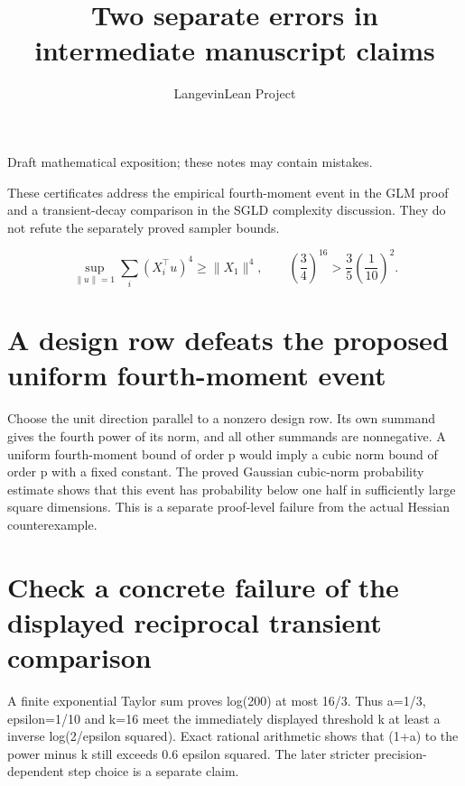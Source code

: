 \documentclass[11pt,a4paper]{article}
\title{\texorpdfstring{Two separate errors in intermediate manuscript claims}{Two separate errors in intermediate manuscript claims}}
\author{LangevinLean Project}
\date{}
\begin{document}
\maketitle
Draft mathematical exposition; these notes may contain mistakes.


These certificates address the empirical fourth-moment event in the GLM proof and a transient-decay comparison in the SGLD complexity discussion. They do not refute the separately proved sampler bounds.

\[\sup_{\|u\|=1}\sum_i(X_i^\top u)^4\ge\|X_1\|^4,\qquad \left(\frac34\right)^{16}>\frac35\left(\frac1{10}\right)^2.\]
\section{\texorpdfstring{A design row defeats the proposed uniform fourth-\allowbreak{}moment event}{A design row defeats the proposed uniform fourth-moment event}}


Choose the unit direction parallel to a nonzero design row. Its own summand gives the fourth power of its norm, and all other summands are nonnegative. A uniform fourth-moment bound of order p would imply a cubic norm bound of order p with a fixed constant. The proved Gaussian cubic-norm probability estimate shows that this event has probability below one half in sufficiently large square dimensions. This is a separate proof-level failure from the actual Hessian counterexample.


\section{\texorpdfstring{Check a concrete failure of the displayed reciprocal transient comparison}{Check a concrete failure of the displayed reciprocal transient comparison}}


A finite exponential Taylor sum proves log(200) at most 16/\allowbreak{}3. Thus a=1/\allowbreak{}3, epsilon=1/\allowbreak{}10 and k=16 meet the immediately displayed threshold k at least a inverse log(2/\allowbreak{}epsilon squared). Exact rational arithmetic shows that (1+a) to the power minus k still exceeds 0.6 epsilon squared. The later stricter precision-dependent step choice is a separate claim.
\end{document}
